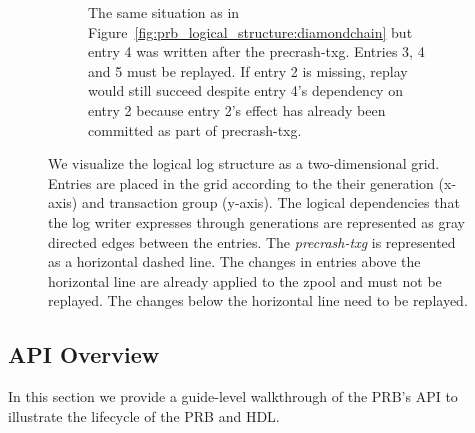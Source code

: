 \documentclass[12pt,a4paper,twoside]{book}
\begin{document}
\begin{figure}[H]
\begin{subfigure}{\textwidth}
        \caption{
            The same situation as in Figure~\ref{fig:prb_logical_structure:diamondchain} but entry 4 was written after the precrash-txg.
            Entries 3, 4 and 5 must be replayed.
            If entry 2 is missing, replay would still succeed despite entry 4's dependency on entry 2 because entry 2's effect has already been committed as part of precrash-txg.
            }
        \label{fig:prb_logical_structure:diamondchain2}
    \end{subfigure}
    \caption{
        We visualize the logical log structure as a two-dimensional grid.
        Entries are placed in the grid according to the their generation (x-axis) and transaction group (y-axis).
        The logical dependencies that the log writer expresses through generations are represented as gray directed edges between the entries.
        The \textit{precrash-txg} is represented as a horizontal dashed line.
        The changes in entries above the horizontal line are already applied to the zpool and must not be replayed.
        The changes below the horizontal line need to be replayed.
    }
    \label{fig:prb_logical_structure}
\end{figure}



\subsection{API Overview}\label{di:prb:api} %
In this section we provide a guide-level walkthrough of the PRB's API to illustrate the lifecycle of the PRB and HDL.
\end{document}
